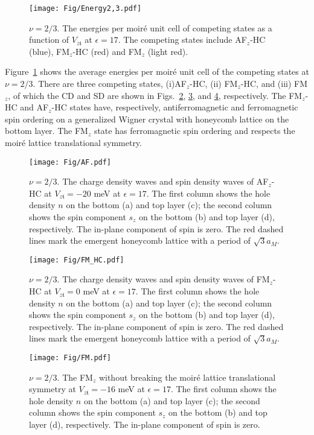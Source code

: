 \documentclass[aps,prl,onecolumn,superscriptaddress,longbibliography]{revtex4-2}
\begin{document}
\begin{figure}[ht]
    \centering
    \texttt{[image: Fig/Energy2,3.pdf]}
    \caption{$\nu=2/3$. The energies per moir\'e unit cell of competing states as a function of $V_{z\mathfrak{t}}$ at $\epsilon=17$. The competing states include AF$_z$-HC (blue), FM$_z$-HC (red) and FM$_z$ (light red).}
    \label{fig:Energy23}
\end{figure}
{Figure~\ref{fig:Energy23} shows the average energies per moir\'e unit cell of the  competing states at $\nu=2/3$. There are three competing states, (i)AF$_z$-HC, (ii) FM$_z$-HC, and (iii) FM$_z$, of which the CD and SD are shown in Figs.~\ref{fig:AF}, \ref{fig:FM_HC}, and \ref{fig:FM}, respectively. The FM$_z$-HC and AF$_z$-HC states  have, respectively, antiferromagnetic and ferromagnetic
spin ordering on a generalized Wigner crystal with honeycomb lattice on the bottom layer. The FM$_z$ state has ferromagnetic spin ordering and respects the moir\'e lattice translational symmetry.
}
\begin{figure}[ht]
    \centering
    \texttt{[image: Fig/AF.pdf]}
    \caption{$\nu=2/3$. The charge density waves and spin density waves of AF$_z$-HC at $V_{z\mathfrak{t}}=-20$ meV at $\epsilon=17$. The first column shows the hole density $n$ on the bottom (a) and top layer (c); the second column shows the spin component $s_z$ on the bottom (b) and top layer (d), respectively. The in-plane component of spin is zero. The red dashed lines mark the emergent honeycomb lattice with a period of $\sqrt{3} a_M$.}
    \label{fig:AF}
\end{figure}

\begin{figure}[ht]
    \centering
    \texttt{[image: Fig/FM\_HC.pdf]}
    \caption{$\nu=2/3$. The charge density waves and spin density waves of FM$_z$-HC at $V_{z\mathfrak{t}}=0$ meV at $\epsilon=17$. The first column shows the hole density $n$ on the bottom (a) and top layer (c); the second column shows the spin component $s_z$ on the bottom (b) and top layer (d), respectively. The in-plane component of spin is zero. The red dashed lines mark the emergent honeycomb lattice with a period of $\sqrt{3} a_M$.}
    \label{fig:FM_HC}
\end{figure}

\begin{figure}[ht]
    \centering
    \texttt{[image: Fig/FM.pdf]}
    \caption{$\nu=2/3$. The FM$_z$ without breaking the moir\'e lattice translational symmetry at $V_{z\mathfrak{t}}=-16$ meV at $\epsilon=17$. The first column shows the hole density $n$ on the bottom (a) and top layer (c); the second column shows the spin component $s_z$ on the bottom (b) and top layer (d), respectively. The in-plane component of spin is zero.}
    \label{fig:FM}
\end{figure}



\end{document}
